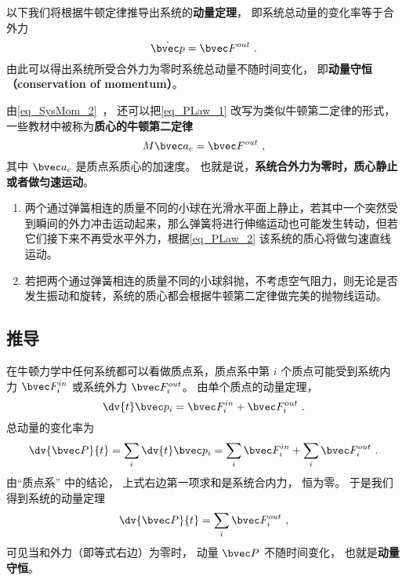 
以下我们将根据牛顿定律推导出系统的\textbf{动量定理}， 即系统总动量的变化率等于合外力
\begin{equation}\label{eq_PLaw_1}
\dot {\bvec p} = \bvec F^{out}~.
\end{equation}
由此可以得出系统所受合外力为零时系统总动量不随时间变化， 即\textbf{动量守恒（conservation of momentum）}。

由\autoref{eq_SysMom_2}~， 还可以把\autoref{eq_PLaw_1} 改写为类似牛顿第二定律的形式， 一些教材中被称为\textbf{质心的牛顿第二定律}
\begin{equation}\label{eq_PLaw_2}
M \bvec a_c = \bvec F^{out}~,
\end{equation}
其中 $\bvec a_c$ 是质点系质心的加速度。 也就是说，\textbf{系统合外力为零时，质心静止或者做匀速运动}。

\begin{example}{}
\begin{enumerate}
\item 两个通过弹簧相连的质量不同的小球在光滑水平面上静止，若其中一个突然受到瞬间的外力冲击运动起来，那么弹簧将进行伸缩运动也可能发生转动，但若它们接下来不再受水平外力，根据\autoref{eq_PLaw_2} 该系统的质心将做匀速直线运动。
\item 若把两个通过弹簧相连的质量不同的小球斜抛，不考虑空气阻力，则无论是否发生振动和旋转，系统的质心都会根据牛顿第二定律做完美的抛物线运动。
\end{enumerate}
\end{example}

\subsection{推导}
在牛顿力学中任何系统都可以看做质点系，质点系中第 $i$ 个质点可能受到系统内力 $\bvec F_i^{in}$ 或系统外力 $\bvec F_i^{out}$。 由单个质点的动量定理，
\begin{equation}
\dv{t} \bvec p_i = \bvec F_i^{in} + \bvec F_i^{out}~.
\end{equation}
总动量的变化率为
\begin{equation}
\dv{\bvec P}{t} = \sum_i \dv{t} \bvec p_i  = \sum_i \bvec F_i^{in}  + \sum_i \bvec F_i^{out}~.
\end{equation}
由“质点系” 中的结论， 上式右边第一项求和是系统合内力， 恒为零。 于是我们得到系统的动量定理
\begin{equation}
\dv{\bvec P}{t} = \sum_i \bvec F_i^{out}~,
\end{equation}
可见当和外力（即等式右边）为零时， 动量 $\bvec P$ 不随时间变化， 也就是\textbf{动量守恒}。

